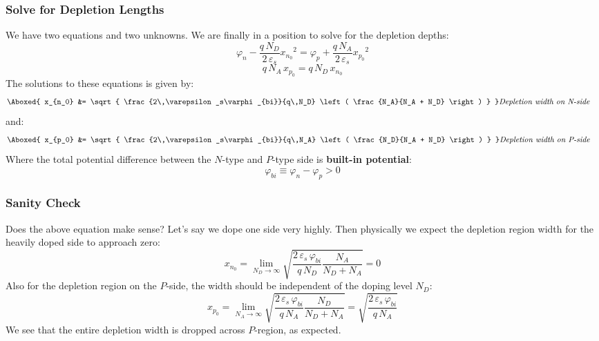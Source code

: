 \subsubsection{Solve for Depletion Lengths}
We have two equations and two unknowns. We are finally in a position to solve for the depletion depths:
    \begin{equation*} 
        \varphi_n - \frac{q\,N_D}{2\,\varepsilon_s}{x_{n_0}}^2 = \varphi_p + \frac{q\,N_A}{2\,\varepsilon_s}{x_{p_0}}^2 
    \end{equation*}
    \begin{equation*} 
        q\,N_A\,x_{p_0} = q\,N_D\,x_{n_0} 
    \end{equation*}
The solutions to these equations is given by:
    \begin{align} 
        \Aboxed{ x_{n_0} &= \sqrt{ \frac{2\,\varepsilon_s\varphi_{bi}}{q\,N_D} \left( \frac{N_A}{N_A + N_D} \right) } }
        &\textit{Depletion width on N-side}
    \end{align}
and:
    \begin{align}
        \Aboxed{ x_{p_0} &= \sqrt{ \frac{2\,\varepsilon_s\varphi_{bi}}{q\,N_A} \left( \frac{N_D}{N_A + N_D} \right) } }
        &\textit{Depletion width on P-side}
    \end{align}
Where the total potential difference between the $N$-type and $P$-type side is \textbf{built-in potential}:
    \begin{equation}
        \varphi_{bi} \equiv \varphi_n - \varphi_p > 0 
    \end{equation}
\subsubsection{Sanity Check}
Does the above equation make sense?  Let's say we dope one side very highly. Then physically we expect the depletion region width for the heavily doped side to approach zero:
    \begin{equation} 
        x_{n_0} = \mathop{\lim}\limits_{{N_D} \to \infty}
                    \sqrt{\frac{2\,\varepsilon_s\,\varphi_{bi}}{q\,N_D} \frac{N_A}{N_D + N_A}} = 0 
    \end{equation}
Also for the depletion region on the $P$-side, the width should be independent of the doping level $N_D$:
    \begin{equation} 
        x_{p_0} = \mathop{\lim}\limits_{{N_A} \to \infty}
                    \sqrt{\frac{2\,\varepsilon_s\,\varphi_{bi}}{q\,N_A} \frac{N_D}{N_D + N_A}} = 
                    \sqrt{\frac{2\,\varepsilon_s\,\varphi_{bi}}{q\,N_A}}
    \end{equation}
We see that the entire depletion width is dropped across $P$-region, as expected.
